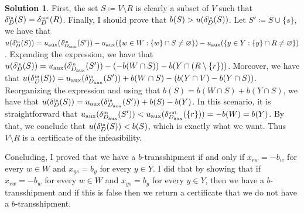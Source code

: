 \documentclass[11pt,leqno,final]{amsart}
\theoremstyle{definition}
\newtheorem{solution}{Solution}
\begin{document}
\begin{solution}
    First, the set $S \coloneqq V \setminus R$ is clearly a subset of $V$ such that $\deltain[D](S) = \deltaout[D](R)$. Finally, I should prove that $b(S) > u(\deltain[D](S))$. Let $S' \coloneqq S \cup \{s\}$, we have that $u(\deltain[D](S)) = u_{\text{aux}}(\deltain[D_{\text{aux}}](S')) - u_{\text{aux}}(\{w \in W: \{w\} \cap S \neq \emptyset\}) - u_{\text{aux}}(\{y \in Y: \{y\} \cap R \neq \emptyset\})$. Expanding the expression, we have that $u(\deltain[D](S)) = u_{\text{aux}}(\deltain[D_{\text{aux}}](S')) - (-b(W \cap S)) - b(Y \cap (R \setminus \{r\}))$. Moreover, we have that $u(\deltain[D](S)) = u_{\text{aux}}(\deltain[D_{\text{aux}}](S')) + b(W \cap S) - (b(Y \cap V) - b(Y \cap S))$. Reorganizing the expression and using that $b(S) = b(W \cap S) + b(Y \cap S)$, we have that $u(\deltain[D](S)) = u_{\text{aux}}(\deltain[D_{\text{aux}}](S')) + b(S) - b(Y)$. In this scenario, it is straightforward that $u_{\text{aux}}(\deltain[D_{\text{aux}}](S')) < u_{\text{aux}}(\deltaout[D_{\text{aux}}](\{r\})) = -b(W) = b(Y)$. By that, we conclude that $u(\deltain[D](S)) < b(S)$, which is exactly what we want. Thus $V \setminus R$ is a certificate of the infeasibility.

    Concluding, I proved that we have a $b$-transshipment if and only if $x_{rw} = -b_w$ for every $w \in W$ and $x_{ys} = b_y$ for every $y \in Y$. I did that by showing that if $x_{rw} = -b_w$ for every $w \in W$ and $x_{ys} = b_y$ for every $y \in Y$, then we have a $b$-transshipment and if this is false then we return a certificate that we do not have a $b$-transshipment.

\end{solution}
\end{document}
